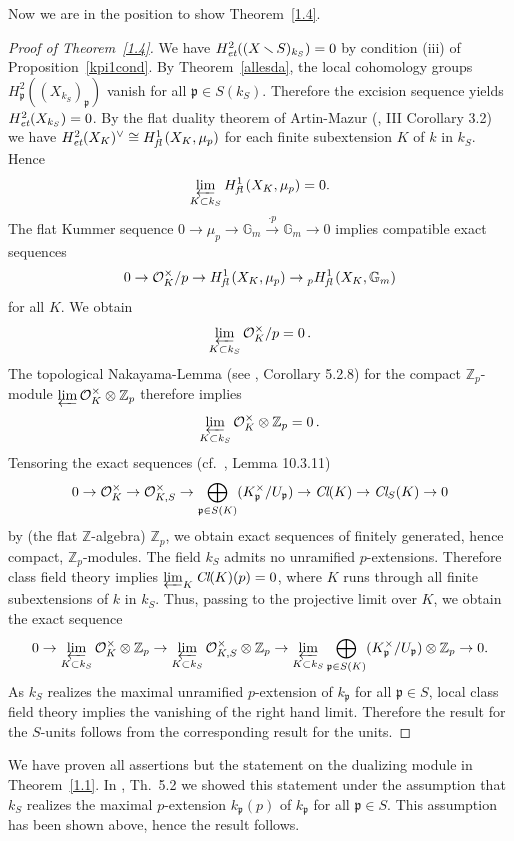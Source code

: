 \documentclass[10pt]{article}
\newcommand{\Z}{{\mathbb Z}}
\newcommand{\G}{{\mathbb G}}
\renewcommand{\O}{{\mathcal{O}}}
\newcommand{\Cl}{\text{\it Cl}}
\newcommand{\p}{{\mathfrak p}}
\newcommand{\sm}{{\,\smallsetminus\,}}
\newcommand{\et}{\text{\it et}}
\newcommand{\fl}{\text{\it fl}\,}
\theoremstyle{alex}
\theoremstyle{alexdef}
\begin{document}
Now we are in the position to show Theorem~\ref{1.4}.


\begin{proof}[Proof of Theorem~\ref{1.4}]
We have $H^2_\et((X\sm S)_{k_S})=0$ by condition (iii) of Proposition~\ref{kpi1cond}. By Theorem~\ref{allesda}, the local cohomology groups $H^2_\p((X_{k_S})_\p)$ vanish for all $\p \in S(k_S)$. Therefore the excision sequence yields $H^2_\et(X_{k_S})=0$. By the flat duality theorem of Artin-Mazur (\cite{Mi}, III Corollary 3.2) we have
$H^2_\et(X_K)^\vee\cong H^1_\fl (X_K,\mu_p)$ for each finite subextension $K$ of $k$ in $k_S$. Hence
\[
\varprojlim_{K\subset k_S} H^1_\fl(X_K,\mu_p)=0.
\]
The flat Kummer sequence $0\to \mu_p \to \G_m \stackrel{\cdot p}{\to} \G_m \to 0$ implies compatible exact sequences
\[
0 \to \O_K^\times /p \to H^1_\fl(X_K,\mu_p) \to \null_p H^1_\fl(X_K,\G_m)
\]
for all $K$.  We obtain
\[
\varprojlim_{K\subset k_S} \O_K^\times /p =0\, .
\]
The topological Nakayama-Lemma (see \cite{NSW}, Corollary 5.2.8) for the compact $\Z_p$-module $\varprojlim \O_K^\times \otimes \Z_p$ therefore implies
\[
\varprojlim_{K\subset k_S} \O_K^\times \otimes \Z_p =0\, .
\]
Tensoring the exact sequences (cf.\ \cite{NSW}, Lemma 10.3.11)
\[
0 \to \O_K^\times \to \O_{K,S}^\times \to \bigoplus_{\p\in S(K)} (K_\p^\times/U_\p) \to \Cl(K) \to \Cl_S(K) \to 0
\]
by (the flat $\Z$-algebra) $\Z_p$, we obtain exact sequences of finitely generated, hence compact, $\Z_p$-modules. The field $k_S$ admits no unramified $p$-extensions. Therefore class field theory implies $\varprojlim_K \Cl(K)(p)=0$, where $K$ runs through all finite subextensions of $k$ in $k_S$. Thus, passing to the projective limit over $K$, we obtain the exact sequence
\[
0 \to \varprojlim_{K\subset k_S} \O_K^\times \otimes \Z_p \to \varprojlim_{K\subset k_S} \O_{K,S}^\times \otimes \Z_p \to \varprojlim_{K\subset k_S} \bigoplus_{\p\in S(K)} (K_\p^\times /U_\p) \otimes \Z_p \to 0.
\]
As $k_S$ realizes the maximal unramified $p$-extension of $k_\p$ for all $\p \in S$, local class field theory implies the vanishing of the right hand limit.
Therefore the result for the $S$-units follows from the corresponding result for the units.
\end{proof}



We have proven all assertions but the statement on the dualizing module in Theorem~\ref{1.1}. In \cite{S}, Th.~5.2 we showed this statement under the assumption that $k_S$ realizes the maximal $p$-extension $k_\p(p)$ of $k_\p$ for all $\p\in S$. This assumption has been shown above, hence the result follows.
\end{document}
